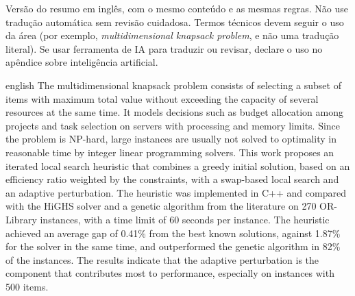 \begin{resumo}[Abstract]
\begin{instrucao}
Versão do resumo em inglês, com o mesmo conteúdo e as mesmas regras. Não use
tradução automática sem revisão cuidadosa. Termos técnicos devem seguir o uso
da área (por exemplo, \emph{multidimensional knapsack problem}, e não uma
tradução literal). Se usar ferramenta de IA para traduzir ou revisar, declare
o uso no apêndice sobre inteligência artificial.
\end{instrucao}

\begin{otherlanguage*}{english}
The multidimensional knapsack problem consists of selecting a subset of items
with maximum total value without exceeding the capacity of several resources at
the same time. It models decisions such as budget allocation among projects and
task selection on servers with processing and memory limits. Since the problem
is NP-hard, large instances are usually not solved to optimality in reasonable
time by integer linear programming solvers. This work proposes an iterated local
search heuristic that combines a greedy initial solution, based on an efficiency
ratio weighted by the constraints, with a swap-based local search and an
adaptive perturbation. The heuristic was implemented in C++ and compared with
the HiGHS solver and a genetic algorithm from the literature on 270 OR-Library
instances, with a time limit of 60 seconds per instance. The heuristic achieved
an average gap of 0.41\% from the best known solutions, against 1.87\% for the
solver in the same time, and outperformed the genetic algorithm in 82\% of the
instances. The results indicate that the adaptive perturbation is the component
that contributes most to performance, especially on instances with 500 items.

\end{otherlanguage*}
\end{resumo}
